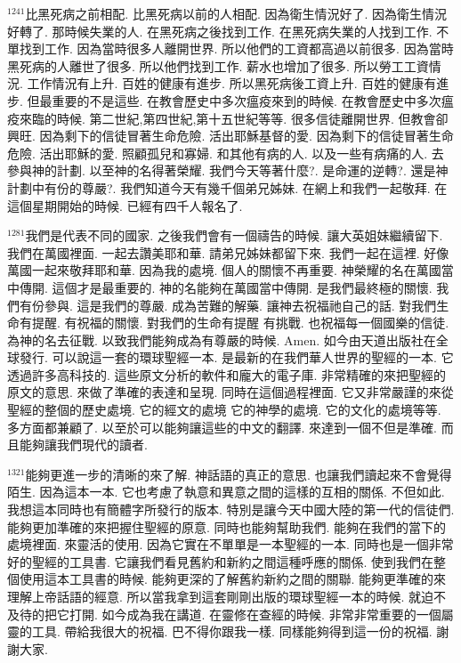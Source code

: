 \documentclass{book}
\begin{document}
$^{1241}$比黑死病之前相配.
比黑死病以前的人相配.
因為衛生情況好了.
因為衛生情況好轉了.
那時候失業的人.
在黑死病之後找到工作.
在黑死病失業的人找到工作.
不單找到工作.
因為當時很多人離開世界.
所以他們的工資都高過以前很多.
因為當時黑死病的人離世了很多.
所以他們找到工作.
薪水也增加了很多.
所以勞工工資情況.
工作情況有上升.
百姓的健康有進步.
所以黑死病後工資上升.
百姓的健康有進步.
但最重要的不是這些.
在教會歷史中多次瘟疫來到的時候.
在教會歷史中多次瘟疫來臨的時候.
第二世紀,第四世紀,第十五世紀等等.
很多信徒離開世界.
但教會卻興旺.
因為剩下的信徒冒著生命危險.
活出耶穌基督的愛.
因為剩下的信徒冒著生命危險.
活出耶穌的愛.
照顧孤兒和寡婦.
和其他有病的人.
以及一些有病痛的人.
去參與神的計劃.
以至神的名得著榮耀.
我們今天等著什麼?.
是命運的逆轉?.
還是神計劃中有份的尊嚴?.
我們知道今天有幾千個弟兄姊妹.
在網上和我們一起敬拜.
在這個星期開始的時候.
已經有四千人報名了.

$^{1281}$我們是代表不同的國家.
之後我們會有一個禱告的時候.
讓大英姐妹繼續留下.
我們在萬國裡面.
一起去讚美耶和華.
請弟兄姊妹都留下來.
我們一起在這裡.
好像萬國一起來敬拜耶和華.
因為我的處境.
個人的關懷不再重要.
神榮耀的名在萬國當中傳開.
這個才是最重要的.
神的名能夠在萬國當中傳開.
是我們最終極的關懷.
我們有份參與.
這是我們的尊嚴.
成為苦難的解藥.
讓神去祝福祂自己的話.
對我們生命有提醒.
有祝福的關懷.
對我們的生命有提醒 有挑戰.
也祝福每一個國樂的信徒.
為神的名去征戰.
以致我們能夠成為有尊嚴的時候.
Amen.
如今由天道出版社在全球發行.
可以說這一套的環球聖經一本.
是最新的在我們華人世界的聖經的一本.
它透過許多高科技的.
這些原文分析的軟件和龐大的電子庫.
非常精確的來把聖經的原文的意思.
來做了準確的表達和呈現.
同時在這個過程裡面.
它又非常嚴謹的來從聖經的整個的歷史處境.
它的經文的處境 它的神學的處境.
它的文化的處境等等.
多方面都兼顧了.
以至於可以能夠讓這些的中文的翻譯.
來達到一個不但是準確.
而且能夠讓我們現代的讀者.

$^{1321}$能夠更進一步的清晰的來了解.
神話語的真正的意思.
也讓我們讀起來不會覺得陌生.
因為這本一本.
它也考慮了執意和異意之間的這樣的互相的關係.
不但如此.
我想這本同時也有簡體字所發行的版本.
特別是讓今天中國大陸的第一代的信徒們.
能夠更加準確的來把握住聖經的原意.
同時也能夠幫助我們.
能夠在我們的當下的處境裡面.
來靈活的使用.
因為它實在不單單是一本聖經的一本.
同時也是一個非常好的聖經的工具書.
它讓我們看見舊約和新約之間這種呼應的關係.
使到我們在整個使用這本工具書的時候.
能夠更深的了解舊約新約之間的關聯.
能夠更準確的來理解上帝話語的經意.
所以當我拿到這套剛剛出版的環球聖經一本的時候.
就迫不及待的把它打開.
如今成為我在講道.
在靈修在查經的時候.
非常非常重要的一個屬靈的工具.
帶給我很大的祝福.
巴不得你跟我一樣.
同樣能夠得到這一份的祝福.
謝謝大家.
\newpage
\end{document}
